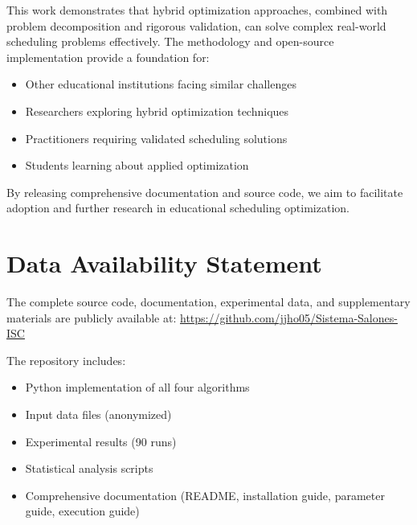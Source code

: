 \documentclass[algorithms,article,submit,pdftex,moreauthors]{Definitions/mdpi}
\begin{document}
This work demonstrates that hybrid optimization approaches, combined with problem decomposition and rigorous validation, can solve complex real-world scheduling problems effectively. The methodology and open-source implementation provide a foundation for:

\begin{itemize}
\item Other educational institutions facing similar challenges
\item Researchers exploring hybrid optimization techniques
\item Practitioners requiring validated scheduling solutions
\item Students learning about applied optimization
\end{itemize}

By releasing comprehensive documentation and source code, we aim to facilitate adoption and further research in educational scheduling optimization.

\section*{Data Availability Statement}

The complete source code, documentation, experimental data, and supplementary materials are publicly available at: \url{https://github.com/jjho05/Sistema-Salones-ISC}

The repository includes:
\begin{itemize}
\item Python implementation of all four algorithms
\item Input data files (anonymized)
\item Experimental results (90 runs)
\item Statistical analysis scripts
\item Comprehensive documentation (README, installation guide, parameter guide, execution guide)
\end{itemize}

\vspace{6pt} 

\end{document}
